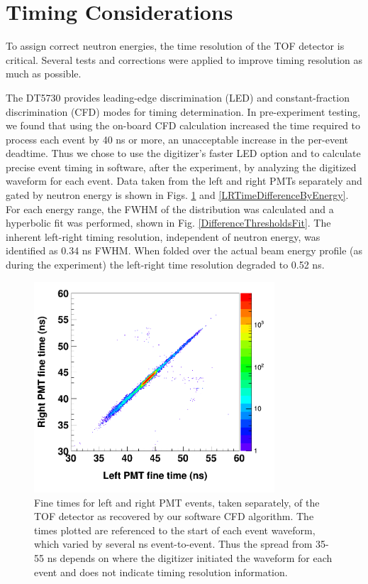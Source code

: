 \section{Timing Considerations}
To assign correct neutron energies, the time resolution of the TOF
detector is critical. Several tests and corrections were applied to improve
timing resolution as much as possible.

The DT5730 provides leading-edge discrimination (\gls{LED}) and constant-fraction discrimination
(\gls{CFD}) modes for timing determination. In pre-experiment testing, we found that using the
on-board CFD calculation increased the time required to process each event by 40
ns or more, an unacceptable increase in the per-event deadtime. Thus we chose
to use the digitizer's faster LED option and to calculate precise event timing
in software, after the experiment, by analyzing the digitized waveform for each event.
Data taken from the left and right PMTs separately and gated by neutron energy 
is shown in Figs. \ref{LRCorrelation} and \ref{LRTimeDifferenceByEnergy}. 
For each energy range, the FWHM of the distribution was calculated and a hyperbolic fit was
performed, shown in Fig. \ref{DifferenceThresholdsFit}. The inherent left-right timing 
resolution, independent of neutron energy, was identified as 0.34 ns FWHM.
When folded over the actual beam energy profile (as during the experiment)
the left-right time resolution degraded to 0.52 ns.

\begin{figure}[tb]
    \centering
    \includegraphics[width=0.8\textwidth]{figures/LRCorrelation.png}
    \caption[Event times for left and right PMTs of time-of-flight detector]
    {Fine times for left and right PMT events, taken separately, of the TOF 
        detector as recovered by our software \gls{CFD} algorithm. The times plotted are referenced
        to the start of each event waveform, which varied by several ns event-to-event.
        Thus the spread from 35-
        55 ns depends on where the digitizer initiated the waveform for each
        event and does not indicate timing resolution information.}
    \label{LRCorrelation}
\end{figure}

